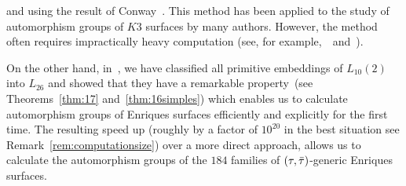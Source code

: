 \documentclass{amsart}
\numberwithin{procedure}{section}
\begin{document}
and using the result of Conway~\cite{Conway1983}.
This method has been applied to the study
of automorphism groups of $K3$ surfaces by many authors.
However, the method often requires impractically heavy computation
(see, for example,~\cite{KKS2014}~and~\cite{Shimada2015}).
\par
On the other hand,
in~\cite{BS2019},
we have classified all primitive embeddings of $L_{10}(2)$ into
$L_{26}$ and showed that they have
a remarkable property~(see Theorems~\ref{thm:17} and~\ref{thm:16simples}) which enables us to calculate automorphism
groups of Enriques surfaces efficiently and explicitly
for the first time.
The resulting speed up (roughly by a factor of $10^{20}$ in the best situation see Remark~\ref{rem:computationsize})
over a more direct approach, allows us to calculate the automorphism groups of the $184$ families of
$(\tau, \bar{\tau})$-generic Enriques surfaces.
%
\end{document}
